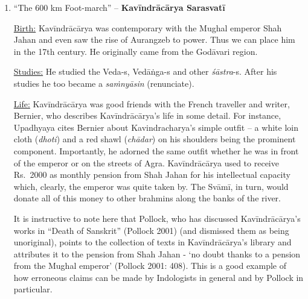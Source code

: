 \begin{enumerate}

 \item 
 “The 600 km Foot-march” – \textbf{Kavīndrācārya Sarasvatī}

 \underline{Birth:} Kavīndrācārya was contemporary with the Mughal emperor Shah Jahan and even saw the rise of Aurangzeb to power. Thus we can place him in the 17th century. He originally came from the Godāvari region.

 \underline{Studies:} He studied the Veda-s, Vedāṅga-s and other \textit{śāstra}-s. After his studies he too became a \textit{saṁnyāsin} (renunciate).

 \underline{Life:} Kavīndrācārya was good friends with the French traveller and writer, Bernier, who describes Kavīndrācārya’s life in some detail. For instance, Upadhyaya cites Bernier about Kavindracharya’s simple outfit – a white loin cloth (\textit{dhoti}) and a red shawl (\textit{chādar}) on his shoulders being the prominent component. Importantly, he adorned the same outfit whether he was in front of the emperor or on the streets of Agra. Kavīndrācārya used to receive Rs.~2000 as monthly pension from Shah Jahan for his intellectual capacity which, clearly, the emperor was quite taken by. The Svāmī, in turn, would donate all of this money to other brahmins along the banks of the river.

 It is instructive to note here that Pollock, who has discussed Kavīndrācārya’s works in “Death of Sanskrit” (Pollock 2001) (and dismissed them as being unoriginal), points to the collection of texts in Kavīndrācārya’s library and attributes it to the pension from Shah Jahan - ‘no doubt thanks to a pension from the Mughal emperor’ (Pollock 2001: 408). This is a good example of how erroneous claims can be made by Indologists in general and by Pollock in particular.


\end{enumerate}
